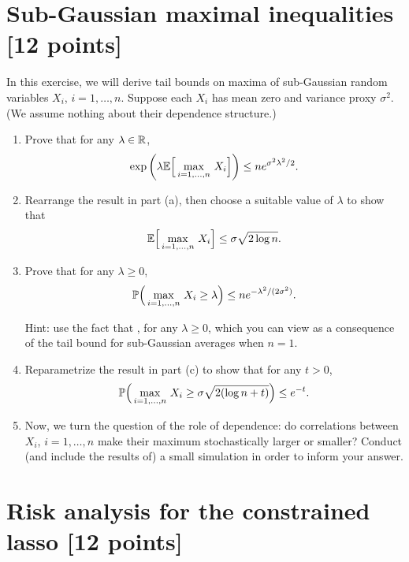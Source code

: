 \documentclass{article}
\begin{document}
\section{Sub-Gaussian maximal inequalities [12 points]}

In this exercise, we will derive tail bounds on maxima of sub-Gaussian random
variables $X_i$, $i=1,\dots,n$. Suppose each $X_i$ has mean zero and variance
proxy $\sigma^2$. (We assume nothing about their dependence structure.)

\begin{enumerate}[label=(\alph*)]
\item Prove that for any $\lambda \in \R$,
  \marginpar{\small [3 pts]}
  \[
  \exp \bigg( \lambda \E\Big[ \max_{i=1,\dots,n} \, X_i \Big] \bigg) \leq n
  e^{\sigma^2 \lambda^2/2}.   
  \]

\item Rearrange the result in part (a), then choose a suitable value of
  $\lambda$ to show that     
  \marginpar{\small [2 pts]}
  \[
  \E \Big[ \max_{i=1,\dots,n} \, X_i \Big] \leq \sigma \sqrt{2 \log n}. 
  \]

\item Prove that for any $\lambda \geq 0$,
  \marginpar{\small [2 pts]}
  \[
  \P \Big(\max_{i=1,\dots,n} \, X_i \geq \lambda \Big) \leq ne^{-\lambda^2 /
    (2\sigma^2)}.  
  \]

  Hint: use the fact that , for any $\lambda \geq 0$, which you can view as a
  consequence of the tail bound for sub-Gaussian averages when $n=1$. 

\item Reparametrize the result in part (c) to show that for any $t>0$,
  \marginpar{\small [1 pt]}
  \[
  \P \Big(\max_{i=1,\dots,n} \, X_i \geq \sigma \sqrt{2 (\log n + t)} \Big) 
  \leq e^{-t}.   
  \]

\item Now, we turn the question of the role of dependence: do correlations 
  between $X_i$, $i=1,\dots,n$ make their maximum stochastically larger or
  smaller? Conduct (and include the results of) a small simulation in order to
  inform your answer. 
  \marginpar{\small [4 pts]}
 \end{enumerate}

\section{Risk analysis for the constrained lasso [12 points]}
\end{document}
